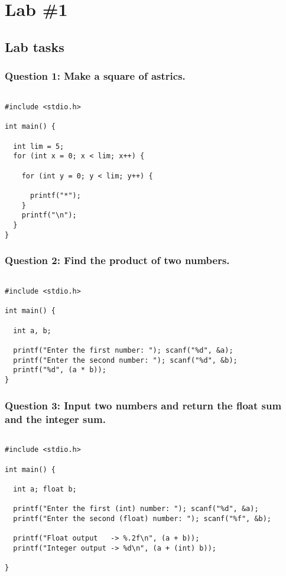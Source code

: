 \documentclass[11pt]{article}
\author{Yahia Gaber}
\date{\today}
\title{}
\begin{document}
\tableofcontents

\section{Lab \#1}
\label{sec:orgf72d510}

\subsection{Lab tasks}
\label{sec:orgf2490ed}

\subsubsection{Question 1: Make a square of astrics.}
\label{sec:org2319685}

\begin{verbatim}

#include <stdio.h>

int main() {

  int lim = 5;
  for (int x = 0; x < lim; x++) {

    for (int y = 0; y < lim; y++) {

      printf("*");
    }
    printf("\n");
  }
}

\end{verbatim}
\subsubsection{Question 2: Find the product of two numbers.}
\label{sec:orgd47c09b}

\begin{verbatim}

#include <stdio.h>

int main() {

  int a, b;

  printf("Enter the first number: "); scanf("%d", &a);
  printf("Enter the second number: "); scanf("%d", &b);
  printf("%d", (a * b));
}

\end{verbatim}
\subsubsection{Question 3: Input two numbers and return the float sum and the integer sum.}
\label{sec:org8b1e931}

\begin{verbatim}

#include <stdio.h>

int main() {

  int a; float b;

  printf("Enter the first (int) number: "); scanf("%d", &a);
  printf("Enter the second (float) number: "); scanf("%f", &b);

  printf("Float output   -> %.2f\n", (a + b));
  printf("Integer output -> %d\n", (a + (int) b));

}

\end{verbatim}
\end{document}
